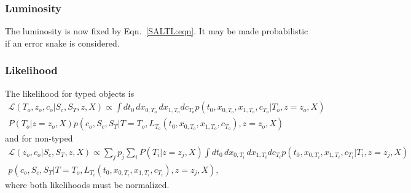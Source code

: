 \documentclass[preprint,3p]{elsarticle}
\begin{document}
\subsubsection{Luminosity}
The luminosity is now fixed by Eqn.\ \ref{SALTL:eqn}.  It may be made probabilistic if an error snake is considered.

\subsubsection{Likelihood}
The likelihood for typed objects is
\begin{multline}
\mathcal{L}(T_o,z_o,c_o | S_c, S_T, z, X)
 \propto \int dt_0 \, dx_{0,T_o} \, dx_{1,T_o} dc_{T_o} 
 p(t_0, x_{0,T_o}, x_{1,T_o}, c_{T_o} |T_o, z=z_o, X) \\ P(T_o|z=z_o, X) p(c_o, S_c, S_T | T=T_o, L_{T_o}(t_0, x_{0,T_o}, x_{1,T_o}, c_{T_o}), z=z_o, X)
\end{multline}
and for non-typed
\begin{multline}
\mathcal{L}(z_o,c_o | S_c, S_T, z, X)
 \propto \sum_j p_j \sum_i P(T_i|z=z_j, X)   \int dt_0 \, dx_{0,T_i} \, dx_{1,T_i} dc_{T_i} 
 p(t_0, x_{0,T_i}, x_{1,T_i}, c_{T_i} |T_i, z=z_j, X) \\  p(c_o, S_c, S_T | T=T_o, L_{T_i}(t_0, x_{0,T_i}, x_{1,T_i}, c_{T_i}), z=z_j, X),
 \end{multline}
where both likelihoods must be normalized.
\end{document}
